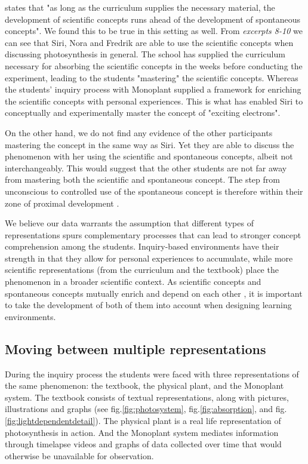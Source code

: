 \citet{vygotsky2012thought} states that "as long as the curriculum supplies the necessary material, the development of scientific concepts runs ahead of the development of spontaneous concepts". We found this to be true in this setting as well. From \emph{excerpts 8-10} we can see that Siri, Nora and Fredrik are able to use the scientific concepts when discussing photosynthesis in general. The school has supplied the curriculum necessary for absorbing the scientific concepts in the weeks before conducting the experiment, leading to the students "mastering" the scientific concepts. Whereas the students' inquiry process with Monoplant supplied a framework for enriching the scientific concepts with personal experiences. This is what has enabled Siri to conceptually and experimentally master the concept of "exciting electrons".  

On the other hand, we do not find any evidence of the other participants mastering the concept in the same way as Siri. Yet they are able to discuss the phenomenon with her using the scientific and spontaneous concepts, albeit not interchangeably. This would suggest that the other students are not far away from mastering both the scientific and spontaneous concept. The step from unconscious to controlled use of the spontaneous concept is therefore within their zone of proximal development \citep{vygotsky2012thought}. 

We believe our data warrants the assumption that different types of representations spurs complementary processes that can lead to stronger concept comprehension among the students. Inquiry-based environments have their strength in that they allow for personal experiences to accumulate, while more scientific representations (from the curriculum and the textbook) place the phenomenon in a broader scientific context. As scientific concepts and spontaneous concepts mutually enrich and depend on each other \citep{vygotsky2012thought}, it is important to take the development of both of them into account when designing learning environments. 

\subsection{Moving between multiple representations}
During the inquiry process the students were faced with three representations of the same phenomenon: the textbook, the physical plant, and the Monoplant system. The textbook consists of textual representations, along with pictures, illustrations and graphs (see fig.\ref{fig:photosystem}, fig.\ref{fig:absorption}, and fig.\ref{fig:lightdependentdetail}). The physical plant is a real life representation of photosynthesis in action. And the Monoplant system mediates information through timelapse videos and graphs of data collected over time that would otherwise be unavailable for observation.  


